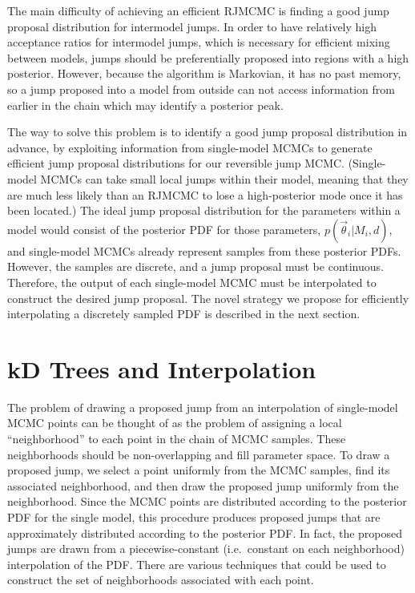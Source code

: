 \documentclass[prd,preprint]{revtex4}
\newcommand{\vtheta}{\vec{\theta}}
\begin{document}
The main difficulty of achieving an efficient RJMCMC is finding a good
jump proposal distribution for intermodel jumps.  In order to have
relatively high acceptance ratios for intermodel jumps, which is
necessary for efficient mixing between models, jumps should be
preferentially proposed into regions with a high posterior.  However,
because the algorithm is Markovian, it has no past memory, so a jump
proposed into a model from outside can not access information from
earlier in the chain which may identify a posterior peak.

The way to solve this problem is to identify a good jump proposal
distribution in advance, by exploiting information from single-model
MCMCs to generate efficient jump proposal distributions for our
reversible jump MCMC.  (Single-model MCMCs can take small local jumps
within their model, meaning that they are much less likely than an
RJMCMC to lose a high-posterior mode once it has been located.)  The
ideal jump proposal distribution for the parameters within a model
would consist of the posterior PDF for those parameters,
$p(\vtheta_i|M_i,d)$, and single-model MCMCs already represent samples
from these posterior PDFs.  However, the samples are discrete, and a
jump proposal must be continuous.  Therefore, the output of each
single-model MCMC must be interpolated to construct the desired jump
proposal.  The novel strategy we propose for efficiently interpolating
a discretely sampled PDF is described in the next section.

\section{kD Trees and Interpolation}
\label{sec:kDTree}

The problem of drawing a proposed jump from an interpolation of
single-model MCMC points can be thought of as the problem of assigning
a local ``neighborhood'' to each point in the chain of MCMC samples.
These neighborhoods should be non-overlapping and fill parameter
space.  To draw a proposed jump, we select a point uniformly from the
MCMC samples, find its associated neighborhood, and then draw the
proposed jump uniformly from the neighborhood.  Since the MCMC points
are distributed according to the posterior PDF for the single model,
this procedure produces proposed jumps that are approximately
distributed according to the posterior PDF.  In fact, the proposed
jumps are drawn from a piecewise-constant (i.e.\ constant on each
neighborhood) interpolation of the PDF.  There are various techniques
that could be used to construct the set of neighborhoods associated
with each point.
\end{document}
